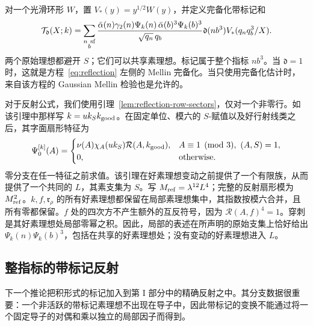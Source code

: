 对一个光滑环形 \(W\)，置 \(V_*(y)=y^{1/2}W(y)\)，并定义完备化带标记和
\begin{equation}\label{eq:marked-completion}
 \mathcal T_{\mathfrak d}(X;k)=
 \sum_{\substack{n\ {\rm sf}\\b}}
 \frac{\bar\alpha(n)\gamma_2(n)\Psi_k(n)\,
       \bar\alpha(b)^3\Psi_k(b)^3}{\sqrt{q_n}\,q_b}
 \mathfrak d(nb^3)V_*(q_nq_b^3/X).
\end{equation}
两个原始理想都避开 \(S\)；它们可以共享素理想。标记属于整个指标 \(nb^3\)。当 \(\mathfrak d=1\) 时，这就是方程~\eqref{eq:reflection} 左侧的 Mellin 完备化。当只使用完备化估计时，来自该方程的 Gaussian Mellin 检验也是允许的。

对于反射公式，我们使用引理~\ref{lem:reflection-row-sectors}，仅对一个非零行。如该引理中那样写 \(k=u k_S k_{\rm good}\)。在固定单位、模六的 \(S\)-赋值以及好行射线类之后，其字面扇形特征为
\[
 \Psi_0^{[k]}(A)=
 \begin{cases}
 \nu(A)\chi_A(u k_S)\mathcal R(A,k_{\rm good}),
       &A\equiv1\pmod3,\ (A,S)=1,\\
 0,&\text{otherwise}.
 \end{cases}
\]
零分支在任一特征之前求值。该引理在好素理想变动之前提供了一个有限族，从而提供了一个共同的 \(L\)，其素支集为 \(S\)。写 \(M_{\rm ref}=\lambda^{12}L^4\)；完整的反射扇形模为 \(M_{\rm ref}^2\)。\(k,f,\mathfrak r_\rho\) 的所有好素理想都保留在局部素理想集中，其指数按模六合并，且所有零都保留。\(f\) 处的四次方不产生额外的互反符号，因为 \(\mathcal R(A,f)^4=1\)。穿刺是其好素理想处局部零幂之积。因此，局部的表述在所声明的原始支集上恰好给出 \(\Psi_k(n)\Psi_k(b)^3\)，包括在共享的好素理想处；没有变动的好素理想进入 \(L\)。

\subsection{整指标的带标记反射}\label{par:reflection-marks}

下一个推论把积形式的标记加入到第 I 部分中的精确反射之中。其分支数据很重要：一个非活跃的带标记素理想不出现在导子中，因此带标记的变换不能通过将一个固定导子的对偶和乘以独立的局部因子而得到。

